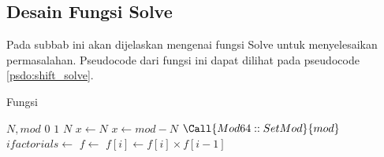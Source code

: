 \subsection{Desain Fungsi Solve}
Pada subbab ini akan dijelaskan mengenai fungsi Solve untuk menyelesaikan permasalahan. Pseudocode dari fungsi ini dapat dilihat pada pseudocode \ref{psdo:shift_solve}.

\begin{algorithm}
	\caption{Fungsi }
	\label{psdo:shift_solve}
	\begin{algorithmic}[1]
		\Require $ N, mod $
		 \Return $ 0 $ \EndIf
		 \Return $ 1 $ \EndIf
		 \Return $ N $ \EndIf
		\State $ x \leftarrow N $
			\State $ x \leftarrow mod - N $
		\EndIf
		\State $ \Call{Mod64::SetMod}{mod}$
		\State $ ifactorials \leftarrow $ 
		\State $ f \leftarrow $ 
			\State $ f[i] \leftarrow f[i] \times f[i-1] $
		\EndFor
		\State \Return {}
	\end{algorithmic}
\end{algorithm}
